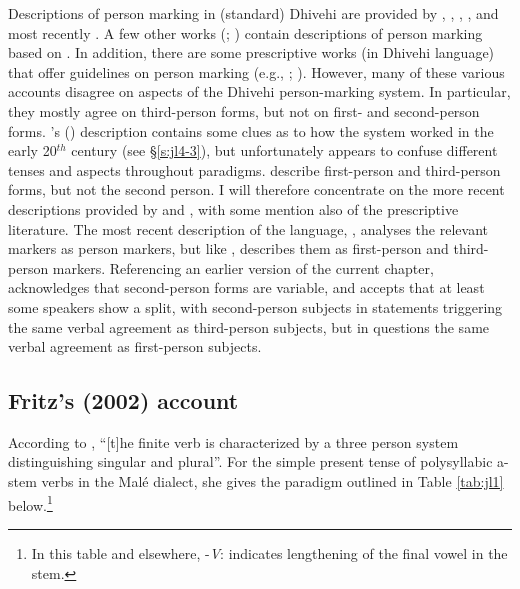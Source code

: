 \documentclass[output=paper]{langsci/langscibook}
\begin{document}
Descriptions of person marking in (standard) Dhivehi are provided by \cite{Geiger1919}, \cite{Wijesundera1988}, \cite{Cain2000}, \cite{Fritz2002}, and most recently \cite{Gnanadesikan2017}. A few other works (\citealt{CainGair2000}; \citealt{Maumoon2002}) contain descriptions of person marking based on \cite{Cain2000}. In addition, there are some prescriptive works (in Dhivehi language) that offer guidelines on person marking (e.g., \citealt{Ahmad1970}; \citealt{Saudiq2012}). However, many of these various accounts disagree on aspects of the Dhivehi person-marking system.  In particular, they mostly agree on third-person forms, but not on first- and second-person forms. \citeauthor{Geiger1919}’s (\citeyear{Geiger1919}) description contains some clues as to how the system worked in the early 20$^{th}$ century (see §‎\ref{s:jl4-3}), but unfortunately appears to confuse different tenses and aspects throughout paradigms. \cite{Wijesundera1988} describe first-person and third-person forms, but not the second person. I will therefore concentrate on the more recent descriptions provided by \cite{CainGair2000} and \cite{Fritz2002}, with some mention also of the prescriptive literature. The most recent description of the language, \cite{Gnanadesikan2017}, analyses the relevant markers as person markers, but like \citeauthor{Wijesundera1988}, describes them as first-person and third-person markers. Referencing an earlier version of the current chapter, \cite[138]{Gnanadesikan2017} acknowledges that second-person forms are variable, and accepts that at least some speakers show a split, with second-person subjects in statements triggering the same verbal agreement as third-person subjects, but in questions the same verbal agreement as first-person subjects.

\subsection{Fritz’s (2002) account}\label{s:jl2-1}

According to \cite[166]{Fritz2002}, “[t]he finite verb is characterized by a three person system distinguishing singular and plural”. For the simple present tense of polysyllabic a-stem verbs in the Malé dialect, she gives the paradigm outlined in Table \ref{tab:jl1} below.\footnote{ In this table and elsewhere, -\textit{V}: indicates lengthening of the final vowel in the stem.}
\end{document}
